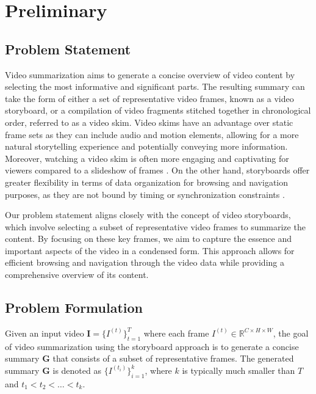 \section{Preliminary}
\label{section:rel-preliminary}

\subsection{Problem Statement}
\label{subsec:rel-statement}

Video summarization aims to generate a concise overview of video content by selecting the most informative and significant parts. The resulting summary can take the form of either a set of representative video frames, known as a video storyboard, or a compilation of video fragments stitched together in chronological order, referred to as a video skim. Video skims have an advantage over static frame sets as they can include audio and motion elements, allowing for a more natural storytelling experience and potentially conveying more information. Moreover, watching a video skim is often more engaging and captivating for viewers compared to a slideshow of frames \cite{Li2001Overview}. On the other hand, storyboards offer greater flexibility in terms of data organization for browsing and navigation purposes, as they are not bound by timing or synchronization constraints \cite{Calic2007Comic,Wang2007VideoCollage}.

Our problem statement aligns closely with the concept of video storyboards, which involve selecting a subset of representative video frames to summarize the content. By focusing on these key frames, we aim to capture the essence and important aspects of the video in a condensed form. This approach allows for efficient browsing and navigation through the video data while providing a comprehensive overview of its content.

\subsection{Problem Formulation}
\label{subsec:rel-formulation}
Given an input video $\textbf{I}=\{I^{(t)}\}_{t=1}^T$ where each frame $I^{(t)} \in \mathbb{R} ^{C \times H \times W}$, the goal of video summarization using the storyboard approach is to generate a concise summary $\textbf{G}$ that consists of a subset of representative frames. The generated summary $\textbf{G}$ is denoted as $\{I^{(t_i)}\}^k_{i=1}$, where $k$ is typically much smaller than $T$ and $t_1 < t_2 < \dots < t_k$.

